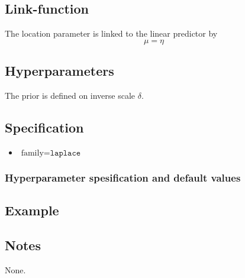 \documentclass[a4paper,11pt]{article}
\begin{document}
\subsection*{Link-function}

The location parameter is linked to the linear predictor by
\begin{displaymath}
    \mu = \eta
\end{displaymath}

\subsection*{Hyperparameters}

The prior is defined on inverse scale $\delta$.

\subsection*{Specification}

\begin{itemize}
\item $\text{family}=\texttt{laplace}$
\end{itemize}

\subsubsection*{Hyperparameter spesification and default values}
%



\subsection*{Example}

%
%
\subsection*{Notes}

None.
\end{document}
